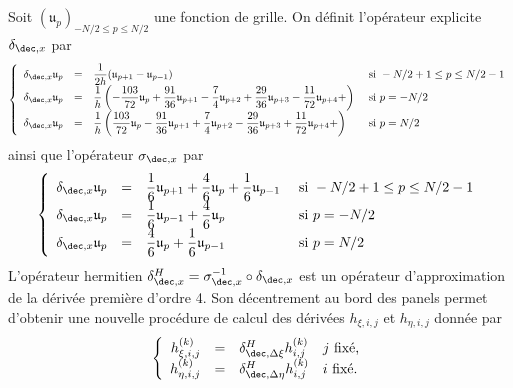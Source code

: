 Soit $(\mathfrak{u}_p)_{-N/2 \leq p \leq N/2}$ une fonction de grille. On définit l'opérateur explicite $\delta_{\dec,x}$ par
\begin{equation}
\left\lbrace
\begin{array}{rcll}
\delta_{\dec,x} \mathfrak{u}_p & = & \dfrac{1}{2 h} (\mathfrak{u}_{p+1}-\mathfrak{u}_{p-1}) & \text{ si } -N/2+1 \leq p \leq N/2-1 \\
\delta_{\dec,x} \mathfrak{u}_p & = & \dfrac{1}{h} \left( -\dfrac{103}{72} \mathfrak{u}_p + \dfrac{91}{36} \mathfrak{u}_{p+1} - \dfrac{7}{4} \mathfrak{u}_{p+2} + \dfrac{29}{36} \mathfrak{u}_{p+3} - \dfrac{11}{72} \mathfrak{u}_{p+4} +\right) & \text{ si } p = -N/2 \\
\delta_{\dec,x} \mathfrak{u}_p & = & \dfrac{1}{h} \left( \dfrac{103}{72} \mathfrak{u}_p - \dfrac{91}{36} \mathfrak{u}_{p+1} + \dfrac{7}{4} \mathfrak{u}_{p+2} - \dfrac{29}{36} \mathfrak{u}_{p+3} + \dfrac{11}{72} \mathfrak{u}_{p+4} +\right) & \text{ si } p = N/2 \\
\end{array}
\right.
\end{equation}
ainsi que l'opérateur $\sigma_{\dec,x}$ par
\begin{equation}
\left\lbrace
\begin{array}{rcll}
\delta_{\dec,x} \mathfrak{u}_p & = & \dfrac{1}{6} \mathfrak{u}_{p+1} + \dfrac{4}{6} \mathfrak{u}_{p} + \dfrac{1}{6} \mathfrak{u}_{p-1} & \text{ si } -N/2+1 \leq p \leq N/2-1 \\
\delta_{\dec,x} \mathfrak{u}_p & = & \dfrac{1}{6} \mathfrak{u}_{p-1} + \dfrac{4}{6} \mathfrak{u}_{p} & \text{ si } p = -N/2 \\
\delta_{\dec,x} \mathfrak{u}_p & = & \dfrac{4}{6} \mathfrak{u}_{p} + \dfrac{1}{6} \mathfrak{u}_{p-1} & \text{ si } p = N/2 \\
\end{array}
\right.
\end{equation}
L'opérateur hermitien $\delta^H_{\dec,x} = \sigma_{\dec,x}^{-1} \circ \delta_{\dec,x}$ est un opérateur d'approximation de la dérivée première d'ordre 4. Son décentrement au bord des panels permet d'obtenir une nouvelle procédure de calcul des dérivées $h_{\xi,i,j}$ et $h_{\eta,i,j}$ donnée par 
\begin{equation}
\left\lbrace
\begin{array}{rcll}
h_{\xi,i,j}^{(k)} & = & \delta^H_{\dec,\Delta \xi} h_{i,j}^{(k)} & j \text{ fixé,}\\
h_{\eta,i,j}^{(k)} & = & \delta^H_{\dec,\Delta \eta} h_{i,j}^{(k)} & i \text{ fixé.}
\end{array}
\right.
\end{equation}
